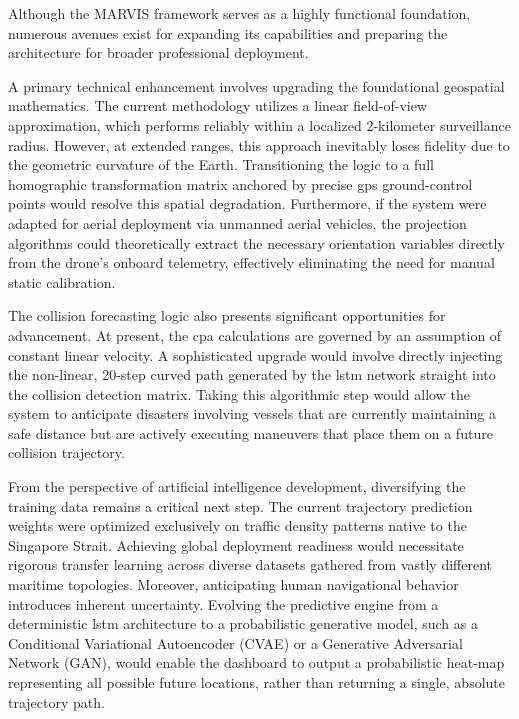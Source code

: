 
Although the MARVIS framework serves as a highly functional foundation, numerous avenues exist for expanding its capabilities and preparing the architecture for broader professional deployment.

A primary technical enhancement involves upgrading the foundational geospatial mathematics. The current methodology utilizes a linear field-of-view approximation, which performs reliably within a localized 2-kilometer surveillance radius. However, at extended ranges, this approach inevitably loses fidelity due to the geometric curvature of the Earth. Transitioning the logic to a full homographic transformation matrix anchored by precise \gls{gps} ground-control points would resolve this spatial degradation. Furthermore, if the system were adapted for aerial deployment via unmanned aerial vehicles, the projection algorithms could theoretically extract the necessary orientation variables directly from the drone's onboard telemetry, effectively eliminating the need for manual static calibration.

The collision forecasting logic also presents significant opportunities for advancement. At present, the \gls{cpa} calculations are governed by an assumption of constant linear velocity. A sophisticated upgrade would involve directly injecting the non-linear, 20-step curved path generated by the \gls{lstm} network straight into the collision detection matrix. Taking this algorithmic step would allow the system to anticipate disasters involving vessels that are currently maintaining a safe distance but are actively executing maneuvers that place them on a future collision trajectory.

From the perspective of artificial intelligence development, diversifying the training data remains a critical next step. The current trajectory prediction weights were optimized exclusively on traffic density patterns native to the Singapore Strait. Achieving global deployment readiness would necessitate rigorous transfer learning across diverse datasets gathered from vastly different maritime topologies. Moreover, anticipating human navigational behavior introduces inherent uncertainty. Evolving the predictive engine from a deterministic \gls{lstm} architecture to a probabilistic generative model, such as a Conditional Variational Autoencoder (CVAE) or a Generative Adversarial Network (GAN), would enable the dashboard to output a probabilistic heat-map representing all possible future locations, rather than returning a single, absolute trajectory path.

